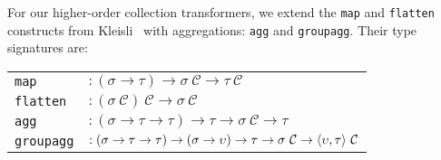 For our higher-order collection transformers, we extend the \texttt{map} and
\texttt{flatten} constructs from Kleisli~\cite{buneman-kleisli:95} with
aggregations: \texttt{agg} and \texttt{groupagg}. Their type signatures are:


\vspace{1mm}\hspace{-4mm}
\begin{tabular}{p{1cm}l}
\texttt{map}
    & $: (\sigma \rightarrow \tau)
           \rightarrow \sigma \ \mathcal{C}
           \rightarrow \tau \ \mathcal{C}$\\
\texttt{flatten}       
    & $: (\sigma\ \mathcal{C}) \ \mathcal{C}
           \rightarrow \sigma \ \mathcal{C}$ \\
\texttt{agg}
    & $: (\sigma \rightarrow \tau \rightarrow \tau)
           \rightarrow \tau
           \rightarrow \sigma \ \mathcal{C}
           \rightarrow \tau$ \\
\texttt{groupagg}
    & $: (\sigma \rightarrow \tau \rightarrow \tau)
           \rightarrow (\sigma \rightarrow \upsilon)
           \rightarrow \tau
           \rightarrow \sigma \ \mathcal{C}
           \rightarrow {\langle\upsilon, \tau\rangle} \ \mathcal{C}$ \\
\end{tabular}


